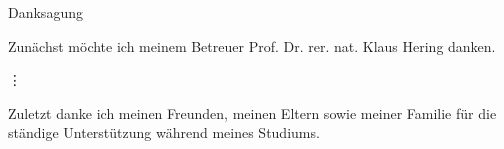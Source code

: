 \thispagestyle{empty}
\begin{center}
\large \lsstyle
Danksagung
\end{center}
\vspace{1.5cm}
Zunächst möchte ich meinem Betreuer Prof. Dr. rer. nat. Klaus Hering danken.

\vdots

Zuletzt danke ich meinen Freunden, meinen Eltern sowie meiner Familie für die ständige Unterstützung während meines Studiums.